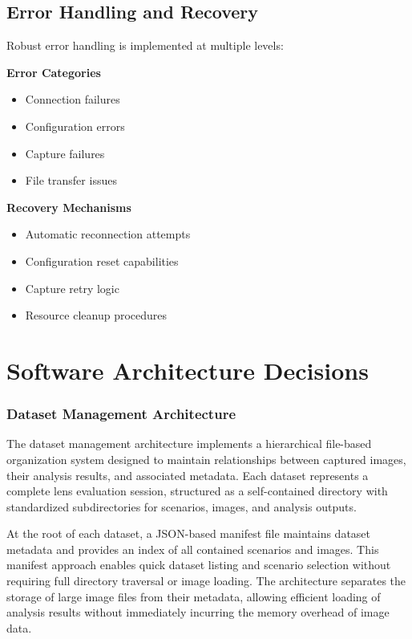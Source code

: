 \subsection{Error Handling and Recovery}
Robust error handling is implemented at multiple levels:

\textbf{Error Categories}
\begin{itemize}
    \item Connection failures
    \item Configuration errors
    \item Capture failures
    \item File transfer issues
\end{itemize}

\textbf{Recovery Mechanisms}
\begin{itemize}
    \item Automatic reconnection attempts
    \item Configuration reset capabilities
    \item Capture retry logic
    \item Resource cleanup procedures
\end{itemize}

\section{Software Architecture Decisions}

\subsubsection{Dataset Management Architecture}
The dataset management architecture implements a hierarchical file-based organization system designed to maintain relationships between captured images, their analysis results, and associated metadata. Each dataset represents a complete lens evaluation session, structured as a self-contained directory with standardized subdirectories for scenarios, images, and analysis outputs.

At the root of each dataset, a JSON-based manifest file maintains dataset metadata and provides an index of all contained scenarios and images. This manifest approach enables quick dataset listing and scenario selection without requiring full directory traversal or image loading. The architecture separates the storage of large image files from their metadata, allowing efficient loading of analysis results without immediately incurring the memory overhead of image data.

